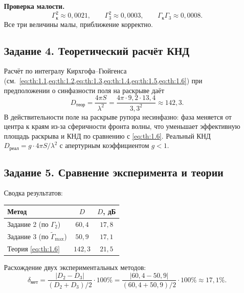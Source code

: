 \noindent\textbf{Проверка малости.}
\begin{equation}
	\Gamma_{\text{к}}^2 \approx 0{,}0021, \qquad
	\Gamma_3^2 \approx 0{,}0003, \qquad
	\Gamma_{\text{к}}\Gamma_3 \approx 0{,}0008.
\end{equation}
Все три величины малы, приближение корректно.

\subsection{Задание 4. Теоретический расчёт КНД}

Расчёт по интегралу Кирхгофа--Гюйгенса (см.~\cref{eq:th:1.1,eq:th:1.2,eq:th:1.3,eq:th:1.4,eq:th:1.5,eq:th:1.6}) при предположении о синфазности поля на раскрыве даёт
\begin{equation}
	D_{\text{теор}} = \frac{4\pi S}{\lambda^2}
	= \frac{4\pi \cdot 9{,}2 \cdot 13{,}4}{3{,}3^2}
	\approx 142{,}3.
\end{equation}
В действительности поле на раскрыве рупора несинфазно: фаза меняется от центра к краям из-за сферичности фронта волны, что уменьшает эффективную площадь раскрыва и КНД по сравнению с \cref{eq:th:1.6}. Реальный КНД $D_{\text{реал}} = g \cdot 4\pi S/\lambda^2$ с апертурным коэффициентом $g < 1$.

\subsection{Задание 5. Сравнение эксперимента и теории}

Сводка результатов:

\begin{center}
	\begin{tabular}{lcc}
		\toprule
		Метод & $D$ & $D$, дБ \\
		\midrule
		Задание 2 (по $\Gamma_2$) & $60{,}4$ & $17{,}8$ \\
		Задание 3 (по $\widetilde{\Gamma}_{\max}$) & $50{,}9$ & $17{,}1$ \\
		Теория \cref{eq:th:1.6} & $142{,}3$ & $21{,}5$ \\
		\bottomrule
	\end{tabular}
\end{center}

Расхождение двух экспериментальных методов:
\begin{equation}
	\delta_{\text{мет}} = \frac{|D_2 - D_3|}{(D_2 + D_3)/2} \cdot 100\%
	= \frac{|60{,}4 - 50{,}9|}{(60{,}4 + 50{,}9)/2} \cdot 100\%
	\approx 17{,}1\%.
\end{equation}

